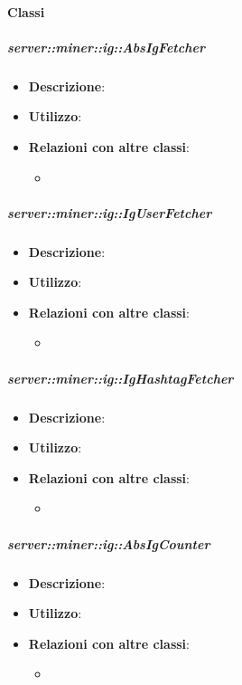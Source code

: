 	\paragraph{Classi} %
	\subparagraph{server::miner::ig::AbsIgFetcher} %
		\label{subp:server_miner_tw_AbsIgFetcher}
			\begin{itemize}
				\item \textbf{Descrizione}:
				\item \textbf{Utilizzo}: 
				\item \textbf{Relazioni con altre classi}:
					\begin{itemize}
						\item 
					\end{itemize}
			\end{itemize}

	\subparagraph{server::miner::ig::IgUserFetcher} %
		\label{subp:server_miner_tw_IgUserFetcher}
			\begin{itemize}
				\item \textbf{Descrizione}:
				\item \textbf{Utilizzo}: 
				\item \textbf{Relazioni con altre classi}:
					\begin{itemize}
						\item 
					\end{itemize}
			\end{itemize}
		
	\subparagraph{server::miner::ig::IgHashtagFetcher} %
		\label{subp:server_miner_tw_IgHashtagFetcher}
			\begin{itemize}
				\item \textbf{Descrizione}:
				\item \textbf{Utilizzo}: 
				\item \textbf{Relazioni con altre classi}:
					\begin{itemize}
						\item 
					\end{itemize}
			\end{itemize}
		
	\subparagraph{server::miner::ig::AbsIgCounter} %
		\label{subp:server_miner_tw_AbsIgCounter}
			\begin{itemize}
				\item \textbf{Descrizione}:
				\item \textbf{Utilizzo}: 
				\item \textbf{Relazioni con altre classi}:
					\begin{itemize}
						\item 
					\end{itemize}
			\end{itemize}
		
